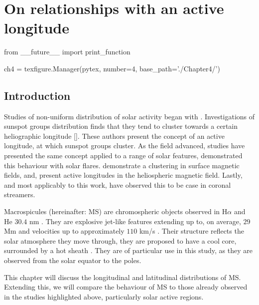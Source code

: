 \chapter{On relationships with an active longitude}
\label{ch:4}  %

\begin{pycode}[chapter4]
from __future__ import print_function

ch4 = texfigure.Manager(pytex, number=4, base_path='./Chapter4/')
\end{pycode}

\section{Introduction}
Studies of non-uniform distribution of solar activity began with \cite{Chidambara1932}.
Investigations of sunspot groups distribution finds that they tend to cluster towards a certain heliographic longitude [\cite{Bumba1965,Balthasar1984,Wilkinson1991}].
These authors present the concept of an active longitude, at which sunspot groups cluster.
As the field advanced, studies have presented the same concept applied to a range of solar features, \cite{Zhang2007} demonstrated this behaviour with solar flares.
\cite{Benevolenskaya1999} demonstrate a clustering in surface magnetic fields, and, \cite{Mursula2004} present active longitudes in the heliospheric magnetic field.
Lastly, and most applicably to this work, \cite{Jing2011} have observed this to be case in coronal streamers.

\newpage
Macrospicules (hereinafter: MS) are chromospheric objects observed in H$\alpha$ and He $30.4$ nm \cite{Bohlin1975,Wang199 8,Murawski2011,Scullion2010}. 
They are explosive jet-like features extending up to, on average, $29$ Mm and velocities up to approximately $110$ km/s \cite{Zaqara_Erdelyi2009}. 
Their structure reflects the solar atmosphere they move through, they are proposed to have a cool core, surrounded by a hot sheath \cite{Parenti2002}. 
They are of particular use in this study, as they are observed from the solar equator to the poles. 

This chapter will discuss the longitudinal and latitudinal distributions of MS.
Extending this, we will compare the behaviour of MS to those already observed in the studies highlighted above, particularly solar active regions.

